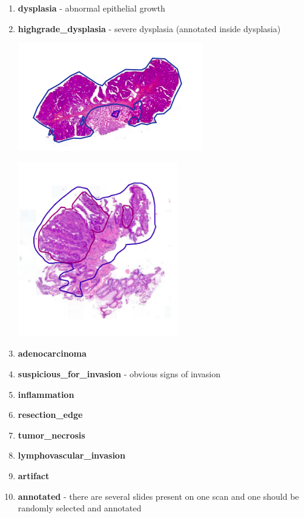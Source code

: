 \documentclass[a4paper,12pt]{article}
\begin{document}
\begin{enumerate}
    \item \textbf{dysplasia} - abnormal epithelial growth
    \item \textbf{highgrade\_dysplasia} - severe dysplasia (annotated inside dysplasia)
    
    \begin{minipage}[t]{0.45\textwidth}
        \centering
        \includegraphics[width=.8\linewidth]{dysplasia.png}
    \end{minipage}
    \begin{minipage}[t]{0.45\textwidth}
        \centering
        \includegraphics[width=.8\linewidth]{high_grade_dysplasia.png}
    \end{minipage}
    
    \item \textbf{adenocarcinoma}
    \item \textbf{suspicious\_for\_invasion} - obvious signs of invasion
    \item \textbf{inflammation}
    \item \textbf{resection\_edge}
    \item \textbf{tumor\_necrosis}
    \item \textbf{lymphovascular\_invasion}
    \item \textbf{artifact}
    \item \textbf{annotated} - there are several slides present on one scan and one should be randomly selected and annotated
    

\end{enumerate}
\end{document}

